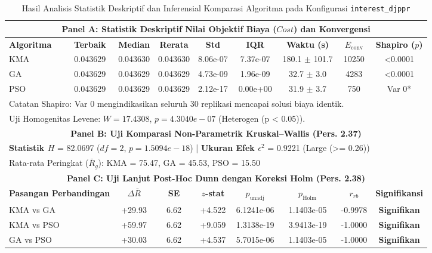 \begin{table}[htbp]
\centering
\caption{Hasil Analisis Statistik Deskriptif dan Inferensial Komparasi Algoritma pada Konfigurasi \texttt{interest_djppr}}
\label{tab:stats_interest_djppr}
\small
\begin{tabular}{lcccccccc}
\toprule
\multicolumn{9}{c}{\textbf{Panel A: Statistik Deskriptif Nilai Objektif Biaya ($Cost$) dan Konvergensi}} \\
\midrule
\textbf{Algoritma} & \textbf{Terbaik} & \textbf{Median} & \textbf{Rerata} & \textbf{Std} & \textbf{IQR} & \textbf{Waktu (s)} & \textbf{$E_{\text{conv}}$} & \textbf{Shapiro ($p$)} \\
\midrule
KMA & 0.043629 & 0.043630 & 0.043630 & 8.06e-07 & 7.37e-07 & 180.1 $\pm$ 101.7 & 10250 & <0.0001 \\
GA & 0.043629 & 0.043629 & 0.043629 & 4.73e-09 & 1.96e-09 & 32.7 $\pm$ 3.0 & 4283 & <0.0001 \\
PSO & 0.043629 & 0.043629 & 0.043629 & 2.12e-17 & 0.00e+00 & 31.9 $\pm$ 3.7 & 750 & Var 0* \\
\midrule
\multicolumn{9}{l}{\footnotesize *Catatan Shapiro: Var 0 mengindikasikan seluruh 30 replikasi mencapai solusi biaya identik.} \\
\multicolumn{9}{l}{\footnotesize Uji Homogenitas Levene: $W = 17.4308$, $p = 4.3040e-07$ (Heterogen (p < 0.05)).} \\
\midrule
\multicolumn{9}{c}{\textbf{Panel B: Uji Komparasi Non-Parametrik Kruskal--Wallis (Pers. 2.37)}} \\
\midrule
\multicolumn{9}{l}{\textbf{Statistik $H$} = 82.0697 \quad ($df = 2$, $p = 1.5094e-18$) \quad | \quad \textbf{Ukuran Efek $\epsilon^2$} = 0.9221 (Large (>= 0.26))} \\
\multicolumn{9}{l}{\footnotesize Rata-rata Peringkat ($\bar{R}_g$): KMA = 75.47, GA = 45.53, PSO = 15.50} \\
\midrule
\multicolumn{9}{c}{\textbf{Panel C: Uji Lanjut Post-Hoc Dunn dengan Koreksi Holm (Pers. 2.38)}} \\
\midrule
\multicolumn{2}{l}{\textbf{Pasangan Perbandingan}} & \textbf{$\Delta \bar{R}$} & \textbf{SE} & \textbf{$z$-stat} & \textbf{$p_{\text{unadj}}$} & \textbf{$p_{\text{Holm}}$} & \textbf{$r_{rb}$} & \textbf{Signifikansi} \\
\midrule
\multicolumn{2}{l}{KMA vs GA} & +29.93 & 6.62 & +4.522 & 6.1241e-06 & 1.1403e-05 & -0.9978 & \textbf{Signifikan} \\
\multicolumn{2}{l}{KMA vs PSO} & +59.97 & 6.62 & +9.059 & 1.3138e-19 & 3.9413e-19 & -1.0000 & \textbf{Signifikan} \\
\multicolumn{2}{l}{GA vs PSO} & +30.03 & 6.62 & +4.537 & 5.7015e-06 & 1.1403e-05 & -1.0000 & \textbf{Signifikan} \\
\bottomrule
\end{tabular}
\end{table}